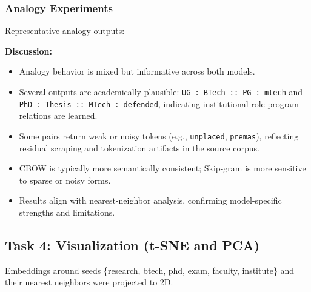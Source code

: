 \documentclass[11pt,a4paper]{article}
\begin{document}
\subsubsection{Analogy Experiments}
Representative analogy outputs:

\begin{table}[H]
\centering
\caption{Analogy Results}
\end{table}

\textbf{Discussion:}
\begin{itemize}[leftmargin=1.5em]
    \item Analogy behavior is mixed but informative across both models.
    \item Several outputs are academically plausible: \texttt{UG : BTech :: PG : mtech} and \texttt{PhD : Thesis :: MTech : defended}, indicating institutional role-program relations are learned.
    \item Some pairs return weak or noisy tokens (e.g., \texttt{unplaced}, \texttt{premas}), reflecting residual scraping and tokenization artifacts in the source corpus.
    \item CBOW is typically more semantically consistent; Skip-gram is more sensitive to sparse or noisy forms.
    \item Results align with nearest-neighbor analysis, confirming model-specific strengths and limitations.
\end{itemize}

\subsection{Task 4: Visualization (t-SNE and PCA)}
Embeddings around seeds \{research, btech, phd, exam, faculty, institute\} and their nearest neighbors were projected to 2D.
\end{document}
